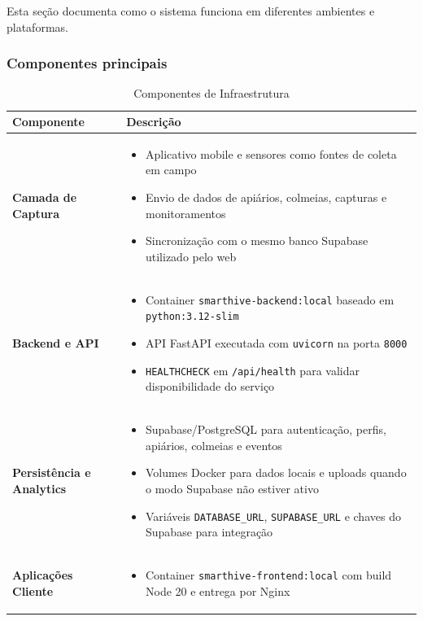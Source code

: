 Esta seção documenta como o sistema funciona em diferentes ambientes e plataformas.

\subsubsection{Componentes principais}

\begin{table}[H]
\centering
\caption{Componentes de Infraestrutura}
\label{tab:infrastructure}
\begin{tabular}{|l|p{10cm}|}
\hline
\textbf{Componente} & \textbf{Descrição} \\
\hline
\textbf{Camada de Captura} &
\begin{itemize}[leftmargin=*, nosep]
    \item Aplicativo mobile e sensores como fontes de coleta em campo
    \item Envio de dados de apiários, colmeias, capturas e monitoramentos
    \item Sincronização com o mesmo banco Supabase utilizado pelo web
\end{itemize} \\
\hline
\textbf{Backend e API} &
\begin{itemize}[leftmargin=*, nosep]
    \item Container \texttt{smarthive-backend:local} baseado em \texttt{python:3.12-slim}
    \item API FastAPI executada com \texttt{uvicorn} na porta \texttt{8000}
    \item \texttt{HEALTHCHECK} em \texttt{/api/health} para validar disponibilidade do serviço
\end{itemize} \\
\hline
\textbf{Persistência e Analytics} &
\begin{itemize}[leftmargin=*, nosep]
    \item Supabase/PostgreSQL para autenticação, perfis, apiários, colmeias e eventos
    \item Volumes Docker para dados locais e uploads quando o modo Supabase não estiver ativo
    \item Variáveis \texttt{DATABASE\_URL}, \texttt{SUPABASE\_URL} e chaves do Supabase para integração
\end{itemize} \\
\hline
\textbf{Aplicações Cliente} &
\begin{itemize}[leftmargin=*, nosep]
    \item Container \texttt{smarthive-frontend:local} com build Node 20 e entrega por Nginx

\end{itemize}
\end{tabular}
\end{table}
